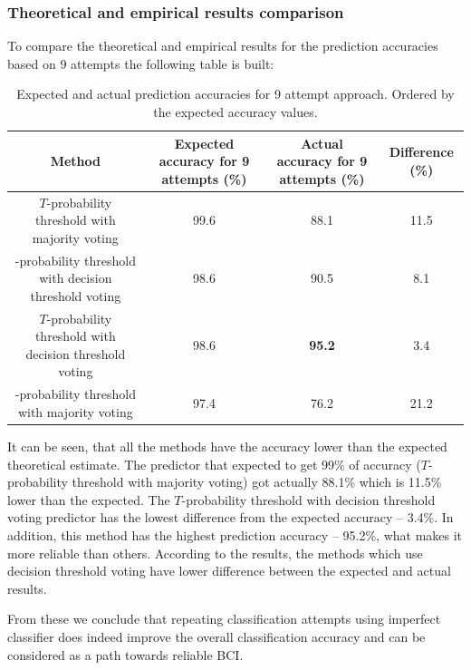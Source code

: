 \documentclass[12pt]{article}
\theoremstyle{definition}
\begin{document}
\subsubsection{Theoretical and empirical results comparison}
\renewcommand{\arraystretch}{2}
To compare the theoretical and empirical results for the prediction accuracies based on 9 attempts the following table is built:
\begin{table}[H]
\begin{center}
  \begin{tabular}{ | c | c | c | c | }
    \hline
    Method &\parbox[c]{1.8cm}{\raggedright Expected accuracy for 9 attempts (\%)} &\parbox[c]{1.8cm}{\raggedright Actual accuracy for 9 attempts (\%)} &\parbox[c]{1.8cm}{\raggedright Difference (\%)}\\ \hline
    \parbox[c]{7cm}{\raggedright $T$-probability threshold with majority voting} & 99.6 & 88.1 & 11.5 \\ \hline
    \parbox[c]{7cm}{-probability threshold with decision threshold voting} & 98.6 & 90.5 & 8.1 \\ \hline
	\parbox[c]{7cm}{$T$-probability threshold with decision threshold voting} & 98.6 & \textbf{95.2} & 3.4\\ \hline
	\parbox[c]{7cm}{-probability threshold with majority voting} & 97.4 & 76.2 & 21.2\\ \hline
  \end{tabular}
\end{center}
\caption{Expected and actual prediction accuracies for 9 attempt approach. Ordered by the expected accuracy values.}
\end{table}

It can be seen, that all the methods have the accuracy lower than the expected theoretical estimate. The predictor that expected to get 99\% of accuracy ($T$-probability threshold with majority voting) got actually 88.1\% which is 11.5\% lower than the expected. The $T$-probability threshold with decision threshold voting predictor has the lowest difference from the expected accuracy -- 3.4\%. In addition, this method has the highest prediction accuracy -- 95.2\%, what makes it more reliable than others. According to the results, the methods which use decision threshold voting have lower difference between the expected and actual results.

From these we conclude that repeating classification attempts using imperfect classifier does indeed improve the overall classification accuracy and can be considered as a path towards reliable BCI.
\end{document}
